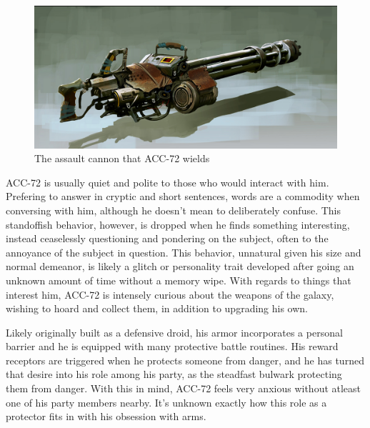 \documentclass[12pt]{article}
\begin{document}
\begin{figure}[!htb]
  \centering
  \includegraphics[width=.7\textwidth]{./resources/assaultcannon}
  \caption{The assault cannon that ACC-72 wields}
\end{figure}

ACC-72 is usually quiet and polite to those who would interact with him.
Prefering to answer in cryptic and short sentences, words are a commodity when
conversing with him, although he doesn't mean to deliberately confuse. 
This standoffish behavior, however, is dropped when he finds something
interesting, instead ceaselessly questioning and pondering on the subject, often
to the annoyance of the subject in question. 
This behavior, unnatural given his size and normal demeanor, is likely a glitch
or personality trait developed after going an unknown amount of time without
a memory wipe. 
With regards to things that interest him, ACC-72 is intensely curious about the
weapons of the galaxy, wishing to hoard and collect them, in addition to
upgrading his own.

Likely originally built as a defensive droid, his armor incorporates a personal
barrier and he is equipped with many protective battle routines. 
His reward receptors are triggered when he protects someone from danger, and he
has turned that desire into his role among his party, as the steadfast bulwark
protecting them from danger. With this in mind, ACC-72 feels very anxious
without atleast one of his party members nearby. 
It's unknown exactly how this role as a protector fits in with his obsession
with arms.
\end{document}
